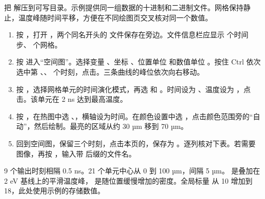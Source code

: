 把  解压到可写目录。示例提供同一组数据的十进制和二进制文件。网格保持静止，温度峰随时间平移，方便在不同绘图页交叉核对同一个数值。
\begin{enumerate}
\item 按 ，打开 ，两个同名开头的  文件保存在旁边。文件信息栏应显示  个时间步、 个网格。
\item 按  进入“空间图”。选择变量 、坐标 、位置单位  和数值单位 。按住 Ctrl 依次选中第 、、 个时刻，点击。三条曲线的峰位依次向右移动。
\item 按 ，选择网格单元的时间演化模式，再选  和 。时间设为 、温度设为 ，点击。该单元在 2 ns 达到最高温度。
\item 按 ，在热图中选 、，横轴设为时间。在颜色设置中选 ，点击颜色范围旁的“自动”，然后绘制。最亮的区域从约 30 µm 移到 70 µm。
\item 回到空间图，保留三个时刻，点击本页的，保存为 。逐列核对下表。若需要图像，再按 ，输入带  后缀的文件名。
\end{enumerate}
9 个输出时刻相隔 0.5 ns。21 个单元中心从 0 到 100 µm，间隔 5 µm。 是叠加在 2 eV 基线上的平滑温度峰， 是随位置缓慢增加的密度。全局标量  从 10 增加到 18，此处使用示例的存储数值。


